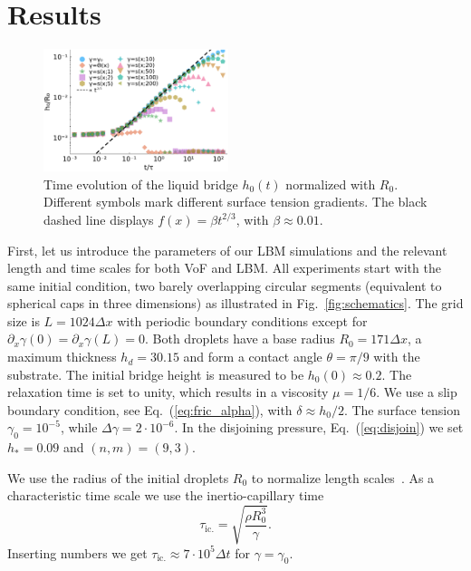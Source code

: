 \documentclass[twocolumn,amsmath,amssymb,showpacs,pre,nofootinbib,superscriptaddress]{revtex4-1} %
\begin{document}
\section{Results}\label{sec:results}
\begin{figure}
    \centering
    \includegraphics[width=0.48\textwidth]{Figures/bridge_evo_all_2.pdf}
    \caption{Time evolution of the liquid bridge $h_0(t)$ normalized with $R_0$. 
    Different symbols mark different surface tension gradients.
    The black dashed line displays $f(x) = \beta t^{2/3}$, with $\beta \approx 0.01$.}
    \label{fig:bridge_growth}
\end{figure}
First, let us introduce the parameters of our LBM simulations and the relevant length and time scales for both VoF and LBM.
All experiments start with the same initial condition, two barely overlapping circular segments (equivalent to spherical caps in three dimensions) as illustrated in Fig.~\ref{fig:schematics}.
The grid size is $L=1024\Delta x$ with periodic boundary conditions except for $\partial_x\gamma(0) = \partial_x\gamma(L) = 0$.
Both droplets have a base radius $R_0 = 171\Delta x$, a maximum thickness $h_d = 30.15$ and form a contact angle $\theta = \pi/9$ with the substrate.
The initial bridge height is measured to be $h_0(0) \approx 0.2$.
The relaxation time is set to unity, which results in a viscosity $\mu = 1/6$. 
We use a slip boundary condition, see Eq.~(\ref{eq:fric_alpha}), with $\delta \approx h_0/2$.
The surface tension $\gamma_0 = 10^{-5}$, while $\Delta\gamma = 2\cdot 10^{-6}$.
In the disjoining pressure, Eq.~(\ref{eq:disjoin}) we set $h_{\ast} = 0.09$ and $(n,m) = (9,3)$.

We use the radius of the initial droplets $R_0$ to normalize length scales~\cite{PhysRevLett.111.144502, PhysRevLett.95.164503}.
As a characteristic time scale we use the inertio-capillary time 
\begin{equation}\label{eq:inertio-cap-time}
    \tau_{\text{ic.}} = \sqrt{\frac{\rho R_0^3}{\gamma}}.
\end{equation}
Inserting numbers we get $\tau_{\text{ic.}} \approx 7\cdot 10^5 \Delta t$ for $\gamma=\gamma_0$. 
\end{document}
